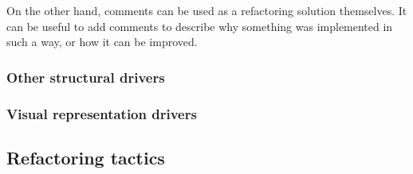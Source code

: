 On the other hand, comments can be used as a refactoring solution themselves. It can be useful to add comments to describe why something was implemented in such a way, or how it can be improved. 

\subsubsection{Other structural drivers}

\subsubsection{Visual representation drivers}
 

\subsection{Refactoring tactics}